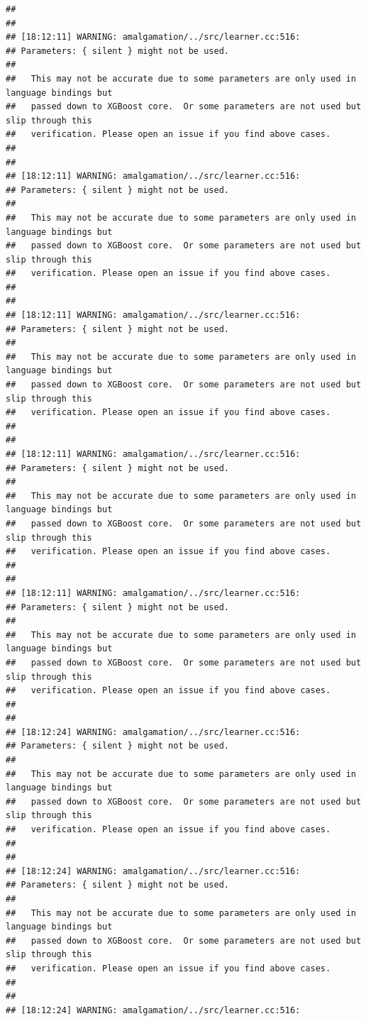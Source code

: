 \documentclass[AMS,STIX2COL]{WileyNJD-v2}\usepackage[]{graphicx}\usepackage[]{color}
\makeatletter
\newenvironment{kframe}{%
 \def\at@end@of@kframe{}%
 \ifinner\ifhmode%
  \def\at@end@of@kframe{\end{minipage}}%
  \begin{minipage}{\columnwidth}%
 \fi\fi%
 \def\FrameCommand##1{\hskip\@totalleftmargin \hskip-\fboxsep
 \colorbox{shadecolor}{##1}\hskip-\fboxsep
     \hskip-\linewidth \hskip-\@totalleftmargin \hskip\columnwidth}%
 \MakeFramed {\advance\hsize-\width
   \@totalleftmargin\z@ \linewidth\hsize
   \@setminipage}}%
 {\par\unskip\endMakeFramed%
 \at@end@of@kframe}
\newenvironment{knitrout}{}{} %
\makeatother
\begin{document}
\begin{knitrout}
\begin{kframe}
\begin{verbatim}
## 
## 
## [18:12:11] WARNING: amalgamation/../src/learner.cc:516: 
## Parameters: { silent } might not be used.
## 
##   This may not be accurate due to some parameters are only used in language bindings but
##   passed down to XGBoost core.  Or some parameters are not used but slip through this
##   verification. Please open an issue if you find above cases.
## 
## 
## [18:12:11] WARNING: amalgamation/../src/learner.cc:516: 
## Parameters: { silent } might not be used.
## 
##   This may not be accurate due to some parameters are only used in language bindings but
##   passed down to XGBoost core.  Or some parameters are not used but slip through this
##   verification. Please open an issue if you find above cases.
## 
## 
## [18:12:11] WARNING: amalgamation/../src/learner.cc:516: 
## Parameters: { silent } might not be used.
## 
##   This may not be accurate due to some parameters are only used in language bindings but
##   passed down to XGBoost core.  Or some parameters are not used but slip through this
##   verification. Please open an issue if you find above cases.
## 
## 
## [18:12:11] WARNING: amalgamation/../src/learner.cc:516: 
## Parameters: { silent } might not be used.
## 
##   This may not be accurate due to some parameters are only used in language bindings but
##   passed down to XGBoost core.  Or some parameters are not used but slip through this
##   verification. Please open an issue if you find above cases.
## 
## 
## [18:12:11] WARNING: amalgamation/../src/learner.cc:516: 
## Parameters: { silent } might not be used.
## 
##   This may not be accurate due to some parameters are only used in language bindings but
##   passed down to XGBoost core.  Or some parameters are not used but slip through this
##   verification. Please open an issue if you find above cases.
## 
## 
## [18:12:24] WARNING: amalgamation/../src/learner.cc:516: 
## Parameters: { silent } might not be used.
## 
##   This may not be accurate due to some parameters are only used in language bindings but
##   passed down to XGBoost core.  Or some parameters are not used but slip through this
##   verification. Please open an issue if you find above cases.
## 
## 
## [18:12:24] WARNING: amalgamation/../src/learner.cc:516: 
## Parameters: { silent } might not be used.
## 
##   This may not be accurate due to some parameters are only used in language bindings but
##   passed down to XGBoost core.  Or some parameters are not used but slip through this
##   verification. Please open an issue if you find above cases.
## 
## 
## [18:12:24] WARNING: amalgamation/../src/learner.cc:516: 

\end{verbatim}
\end{kframe}
\end{knitrout}
\end{document}
